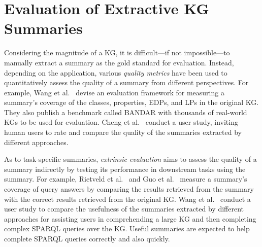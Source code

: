 \section{Evaluation of Extractive KG Summaries}
\label{sec:benchmark}

Considering the magnitude of a KG, it is difficult---if not impossible---to manually extract a summary as the gold standard for evaluation. Instead, depending on the application, various \emph{quality metrics} have been used to quantitatively assess the quality of a summary from different perspectives. For example, Wang et al.~ devise an evaluation framework for measuring a summary's coverage of the classes, properties, EDPs, and LPs in the original KG. They also publish a benchmark called BANDAR with thousands of real-world KGs to be used for evaluation.
Cheng et al.~ conduct a user study, inviting human users to rate and compare the quality of the summaries extracted by different approaches.

As to task-specific summaries, \emph{extrinsic evaluation} aims to assess the quality of a summary indirectly by testing its performance in downstream tasks using the summary. For example, Rietveld et al.~ and Guo et al.~ measure a summary's coverage of query answers by comparing the results retrieved from the summary with the correct results retrieved from the original KG.
Wang et al.~ conduct a user study to compare the usefulness of the summaries extracted by different approaches for assisting users in comprehending a large KG and then completing complex SPARQL queries over the KG. Useful summaries are expected to help complete SPARQL queries correctly and also quickly.

